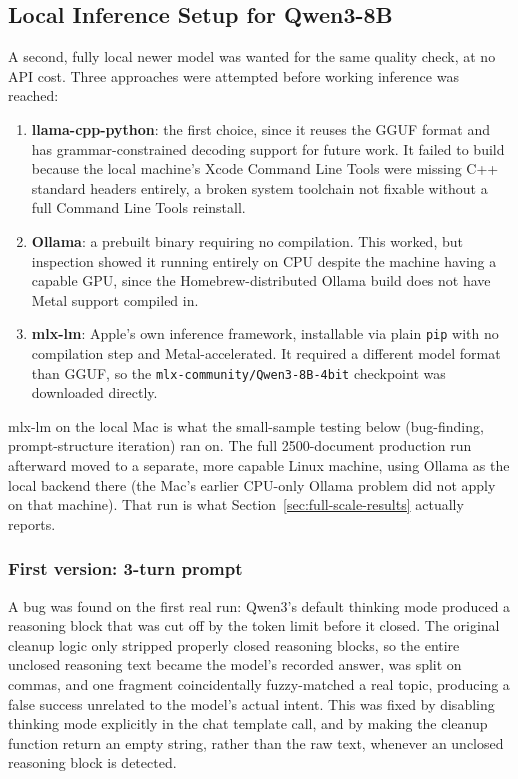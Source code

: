 \subsection{Local Inference Setup for Qwen3-8B}
\label{sec:local-inference-setup}

A second, fully local newer model was wanted for the same quality check, at no API cost. Three approaches were attempted before working inference was reached:

\begin{enumerate}
    \item \textbf{llama-cpp-python}: the first choice, since it reuses the GGUF format and has grammar-constrained decoding support for future work. It failed to build because the local machine's Xcode Command Line Tools were missing C++ standard headers entirely, a broken system toolchain not fixable without a full Command Line Tools reinstall.
    \item \textbf{Ollama}: a prebuilt binary requiring no compilation. This worked, but inspection showed it running entirely on CPU despite the machine having a capable GPU, since the Homebrew-distributed Ollama build does not have Metal support compiled in.
    \item \textbf{mlx-lm}: Apple's own inference framework, installable via plain \texttt{pip} with no compilation step and Metal-accelerated. It required a different model format than GGUF, so the \texttt{mlx-community/Qwen3-8B-4bit} checkpoint was downloaded directly.
\end{enumerate}

mlx-lm on the local Mac is what the small-sample testing below (bug-finding, prompt-structure iteration) ran on. The full 2500-document production run afterward moved to a separate, more capable Linux machine, using Ollama as the local backend there (the Mac's earlier CPU-only Ollama problem did not apply on that machine). That run is what Section~\ref{sec:full-scale-results} actually reports.

\subsubsection{First version: 3-turn prompt}

A bug was found on the first real run: Qwen3's default thinking mode produced a reasoning block that was cut off by the token limit before it closed. The original cleanup logic only stripped properly closed reasoning blocks, so the entire unclosed reasoning text became the model's recorded answer, was split on commas, and one fragment coincidentally fuzzy-matched a real topic, producing a false success unrelated to the model's actual intent. This was fixed by disabling thinking mode explicitly in the chat template call, and by making the cleanup function return an empty string, rather than the raw text, whenever an unclosed reasoning block is detected.

